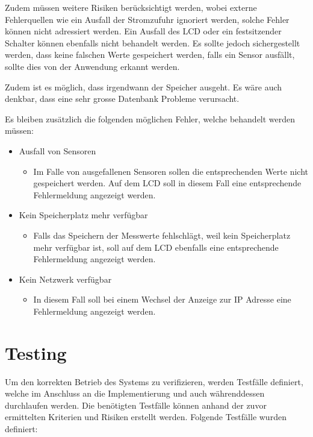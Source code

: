 \documentclass[
    10pt,
    a4paper,
]{scrartcl}
\begin{document}
Zudem müssen weitere Risiken berücksichtigt werden, wobei externe Fehlerquellen wie ein
Ausfall der Stromzufuhr ignoriert werden, solche Fehler können nicht adressiert werden.
Ein Ausfall des LCD oder ein festsitzender Schalter können ebenfalls nicht behandelt
werden. Es sollte jedoch sichergestellt werden, dass keine falschen Werte gespeichert
werden, falls ein Sensor ausfällt, sollte dies von der Anwendung erkannt werden.

Zudem ist es möglich, dass irgendwann der Speicher ausgeht. Es wäre auch denkbar, dass
eine sehr grosse Datenbank Probleme verursacht.

Es bleiben zusätzlich die folgenden möglichen Fehler, welche behandelt werden müssen:

\begin{itemize}
    \item Ausfall von Sensoren
        \begin{itemize}
            \item Im Falle von ausgefallenen Sensoren sollen die entsprechenden Werte
                nicht gespeichert werden. Auf dem LCD soll in diesem Fall eine
                entsprechende Fehlermeldung angezeigt werden.
        \end{itemize}
    \item Kein Speicherplatz mehr verfügbar
        \begin{itemize}
            \item Falls das Speichern der Messwerte fehlschlägt, weil kein Speicherplatz
                mehr verfügbar ist, soll auf dem LCD ebenfalls eine entsprechende
                Fehlermeldung angezeigt werden.
        \end{itemize}
    \item Kein Netzwerk verfügbar
        \begin{itemize}
            \item In diesem Fall soll bei einem Wechsel der Anzeige zur IP Adresse eine
                Fehlermeldung angezeigt werden.
        \end{itemize}
\end{itemize}

\section{Testing}

Um den korrekten Betrieb des Systems zu verifizieren, werden Testfälle definiert, welche
im Anschluss an die Implementierung und auch währenddessen durchlaufen werden. Die
benötigten Testfälle können anhand der zuvor ermittelten Kriterien und Risiken erstellt
werden. Folgende Testfälle wurden definiert:
\end{document}
